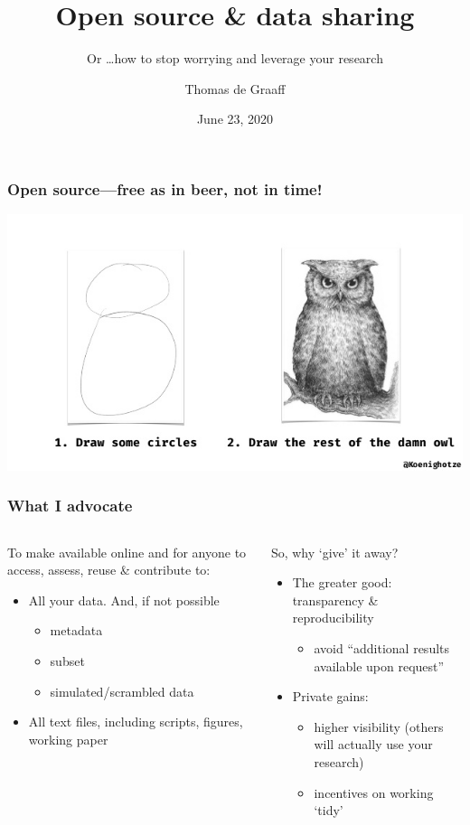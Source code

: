 \documentclass[ignorenonframetext]{beamer}
\title{Open source \& data sharing}
\subtitle{Or \ldots how to stop worrying and leverage your research}
\author{Thomas de Graaff}
\institute{Department of Spatial Economics}
\date{June 23, 2020}
\begin{document}
\frame{\titlepage}

\begin{frame}
  \frametitle{Open source---free as in beer, not in time!}
    \centering
    \includegraphics[width = 1\textwidth]{owl.jpg}
  \end{frame}

\begin{frame}
  \frametitle{What I advocate}
  \begin{columns}
    \begin{column}{.5\textwidth}
      To make available online and for anyone to \alert{access}, \alert{assess}, \alert{reuse} \& \alert{contribute} to:
      \begin{itemize}
        \item All your \alert{data}. And, if not possible
          \begin{itemize}
            \item metadata
            \item subset
            \item simulated/scrambled data
          \end{itemize}
        \item All \alert{text} files, including scripts, figures, working paper\pause
        \end{itemize}
    \end{column}

    \begin{column}{.5\textwidth}
      So, why `give' it away?
      \begin{itemize}
        \item The greater good: \alert{transparency} \& \alert{reproducibility}
          \begin{itemize}
            \item avoid ``additional results available upon request''
          \end{itemize}
        \item \alert{Private} gains:
          \begin{itemize}
            \item higher visibility (others will actually use your research)
              \item incentives on working `tidy'
          \end{itemize}
      \end{itemize}
    \end{column}
  \end{columns}
\end{frame}
\end{document}
